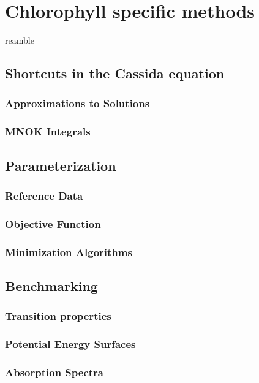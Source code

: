 %
%
\let\textcircled=\pgftextcircled
\chapter{Chlorophyll specific methods}
\label{chap:chl_xtb}

reamble

\section{Shortcuts in the Cassida equation}
\label{sec:cassida}

\subsection{Approximations to Solutions}
\label{subsec:chl_approxs}

\subsection{MNOK Integrals}
\label{subsec:MNOK}

\section{Parameterization}
\label{sec:chl_params}

\subsection{Reference Data}
\label{subsec:chl_params}

\subsection{Objective Function}
\label{subsec:obj_func}

\subsection{Minimization Algorithms}
\label{subsec:algorithms}


\section{Benchmarking}
\label{sec:chl_benchmarking}

\subsection{Transition properties}

\subsection{Potential Energy Surfaces}

\subsection{Absorption Spectra}


